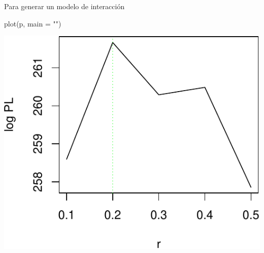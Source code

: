 \documentclass[
  11pt,
  ignorenonframetext,
]{beamer}
\newenvironment{Shaded}{}{}
\newcommand{\AttributeTok}[1]{\textcolor[rgb]{0.49,0.56,0.16}{#1}}
\newcommand{\FunctionTok}[1]{\textcolor[rgb]{0.02,0.16,0.49}{#1}}
\newcommand{\NormalTok}[1]{#1}
\newcommand{\StringTok}[1]{\textcolor[rgb]{0.25,0.44,0.63}{#1}}
\begin{document}
\begin{frame}[fragile]{Para generar un modelo de interacción}
\protect\hypertarget{para-generar-un-modelo-de-interacciuxf3n-1}{}
\begin{Shaded}
\begin{Highlighting}[]
\FunctionTok{plot}\NormalTok{(p, }\AttributeTok{main =} \StringTok{""}\NormalTok{)}
\end{Highlighting}
\end{Shaded}

\begin{center}\includegraphics{Tutorial-spatstat-2_files/figure-beamer/unnamed-chunk-30-1} \end{center}
\end{frame}
\end{document}
